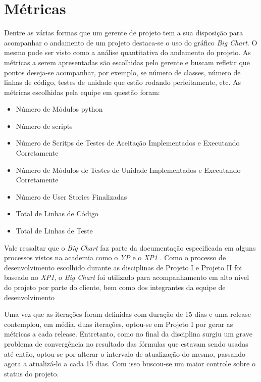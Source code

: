 \chapter{Métricas}

Dentre as várias formas que um gerente de projeto tem a sua disposição para acompanhar o andamento de um 
projeto destaca-se o uso do gráfico \textit{Big Chart}. O mesmo pode ser visto como a análise quantitativa do 
andamento do projeto. As métricas a serem apresentadas são escolhidas pelo gerente e buscam refletir que 
pontos deseja-se acompanhar, por exemplo, se número de classes, número de linhas de código, testes de unidade 
que estão rodando perfeitamente, etc. As métricas escolhidas pela equipe em questão foram:

\begin{itemize}
 \item Número de Módulos python
 \item Número de scripts
 \item Número de Scritps de Testes de Aceitação Implementados e Executando Corretamente
 \item Número de Módulos de Testes de Unidade Implementados e Executando Corretamente
 \item Número de User Stories Finalizadas
 \item Total de Linhas de Código
 \item Total de Linhas de Teste
\end{itemize}


Vale ressaltar que o \textit{Big Chart} faz parte da documentação especificada em alguns processos vistos
 na academia como o \textit{YP} \cite{yp} e o \textit{XP1} \cite{xp1}. Como o processo de desenvolvimento 
escolhido durante as disciplinas de Projeto I e Projeto II foi baseado no \textit{XP1}, o \textit{Big Chart} 
foi utilizado para acompanhamento em alto nível do projeto por parte do cliente, bem como dos integrantes da 
equipe de desenvolvimento

Uma vez que as iterações foram definidas com duração de 15 dias e uma release contemplou, em média, duas 
iterações, optou-se em Projeto I por gerar as métricas a cada release. Entretanto, como no final da disciplina 
surgiu um grave problema de convergência no resultado das fórmulas que estavam sendo usadas até então, 
optou-se por alterar o intervalo de atualização do mesmo, passando agora a atualizá-lo a cada 15 dias. Com 
isso buscou-se um maior controle sobre o status do projeto.

